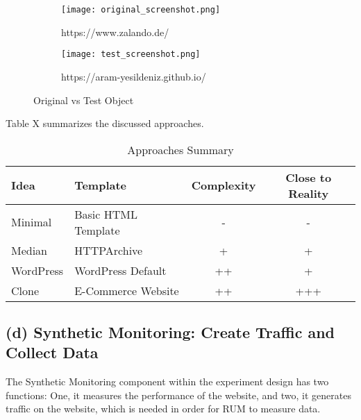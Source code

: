 \begin{figure}
	\centering
	\begin{subfigure}{.5\textwidth}
		\centering
		\texttt{[image: original\_screenshot.png]}
		\caption{https://www.zalando.de/}
		\label{fig:sub1}
	\end{subfigure}%
	\begin{subfigure}{.5\textwidth}
		\centering
		\texttt{[image: test\_screenshot.png]}
		\caption{https://aram-yesildeniz.github.io/}
		\label{fig:sub2}
	\end{subfigure}
	\caption{Original vs Test Object}
	\label{figure:zalando_original_test}
\end{figure}


Table X summarizes the discussed approaches.


\begin{table}[h]
	\small
	\centering
	\begin{tabular}{ | l | l | c | c | }
	\hline
	\cellcolor{lightgrey} Idea & \cellcolor{lightgrey} Template & \cellcolor{lightgrey} Complexity & \cellcolor{lightgrey} Close to Reality \\
	\hline
	Minimal & Basic HTML Template & - & - \\
	Median & HTTPArchive & + & + \\
	WordPress & WordPress Default & ++ & + \\
	Clone & E-Commerce Website & ++ & +++ \\
	\hline
	\end{tabular}
	\medskip
	\caption{Approaches Summary}
	\label{table:performance_metrics_conclusion}
\end{table}




\subsection{(d) Synthetic Monitoring: Create Traffic and Collect Data}

The Synthetic Monitoring component within the experiment design has two functions:
One, it measures the performance of the website, and two, it generates traffic on the website, which is needed in order for RUM to measure data.



